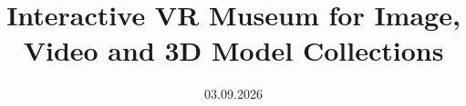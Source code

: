 \documentclass[a4paper, 10pt, oneside]{memoir}
\title				{Interactive VR Museum for Image, Video and 3D Model Collections}
\date				{03.09.2026}
\begin{document}

\thesisfront
\maketitle
\pagestyle{thesis}



\thesistoc

\thesismain







\thesisappendix
\thesisbib
\cleardoublepage
\listoffigures
\cleardoublepage
\begin{appendices}
	
	
	
\end{appendices}
\thesisback

\end{document}
